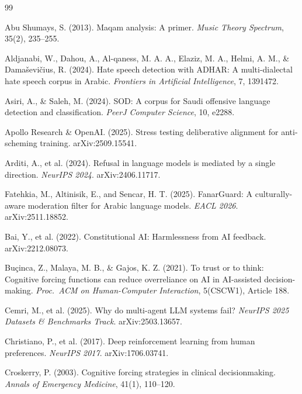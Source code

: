 \documentclass[11pt,a4paper]{article}
\begin{document}
\begin{thebibliography}{99}

Abu Shumays, S. (2013). Maqam analysis: A primer. \textit{Music Theory Spectrum}, 35(2), 235--255.

Aldjanabi, W., Dahou, A., Al-qaness, M. A. A., Elaziz, M. A., Helmi, A. M., \& Damaševičius, R. (2024). Hate speech detection with ADHAR: A multi-dialectal hate speech corpus in Arabic. \textit{Frontiers in Artificial Intelligence}, 7, 1391472.

Asiri, A., \& Saleh, M. (2024). SOD: A corpus for Saudi offensive language detection and classification. \textit{PeerJ Computer Science}, 10, e2288.

Apollo Research \& OpenAI. (2025). Stress testing deliberative alignment for anti-scheming training. arXiv:2509.15541.

Arditi, A., et al. (2024). Refusal in language models is mediated by a single direction. \textit{NeurIPS 2024}. arXiv:2406.11717.

Fatehkia, M., Altinisik, E., and Sencar, H. T. (2025). FanarGuard: A culturally-aware moderation filter for Arabic language models. \textit{EACL 2026}. arXiv:2511.18852.

Bai, Y., et al. (2022). Constitutional AI: Harmlessness from AI feedback. arXiv:2212.08073.

Buçinca, Z., Malaya, M. B., \& Gajos, K. Z. (2021). To trust or to think: Cognitive forcing functions can reduce overreliance on AI in AI-assisted decision-making. \textit{Proc.\ ACM on Human-Computer Interaction}, 5(CSCW1), Article 188.

Cemri, M., et al. (2025). Why do multi-agent LLM systems fail? \textit{NeurIPS 2025 Datasets \& Benchmarks Track}. arXiv:2503.13657.

Christiano, P., et al. (2017). Deep reinforcement learning from human preferences. \textit{NeurIPS 2017}. arXiv:1706.03741.

Croskerry, P. (2003). Cognitive forcing strategies in clinical decisionmaking. \textit{Annals of Emergency Medicine}, 41(1), 110--120.


\end{thebibliography}
\end{document}

